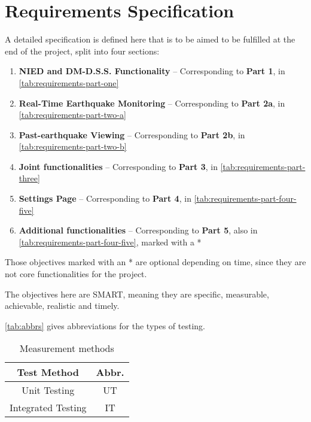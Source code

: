 \section{Requirements Specification}

A detailed specification is defined here that is to be aimed to be fulfilled at the end of the project, split into four sections:
\begin{enumerate}
    \item \textbf{NIED and DM-D.S.S. Functionality} -- Corresponding to \textbf{Part 1}, in \autoref{tab:requirements-part-one}
    \item \textbf{Real-Time Earthquake Monitoring} -- Corresponding to \textbf{Part 2a}, in \autoref{tab:requirements-part-two-a}
    \item \textbf{Past-earthquake Viewing} -- Corresponding to \textbf{Part 2b}, in \autoref{tab:requirements-part-two-b}
    \item \textbf{Joint functionalities} -- Corresponding to \textbf{Part 3}, in \autoref{tab:requirements-part-three}
    \item \textbf{Settings Page} -- Corresponding to \textbf{Part 4}, in \autoref{tab:requirements-part-four-five}
    \item \textbf{Additional functionalities} -- Corresponding to \textbf{Part 5}, also in \autoref{tab:requirements-part-four-five}, marked with a *
\end{enumerate}

Those objectives marked with an * are optional depending on time, since they are not core functionalities for the project.

The objectives here are SMART, meaning they are specific, measurable, achievable, realistic and timely.

\autoref{tab:abbrs} gives abbreviations for the types of testing.

\begin{table}[htp]
    \centering
    \begin{tabular}{cc}
        Test Method        & Abbr. \\
        \hline
        Unit Testing       & UT    \\
        Integrated Testing & IT    \\
    \end{tabular}
    \caption{Measurement methods}
    \label{tab:abbrs}
\end{table}

